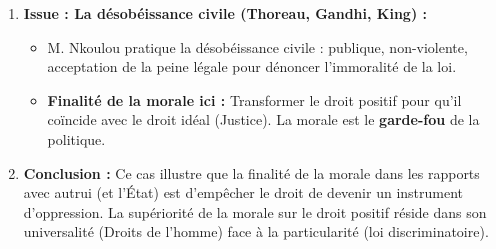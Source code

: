 \documentclass[11pt]{article}
\newcommand{\cle}[1]{{\popxbold\color{popdark}#1}}
\begin{document}
\begin{exoresolu}
\begin{enumerate}
    \item \textbf{Issue : La désobéissance civile (Thoreau, Gandhi, King) :}
    \begin{itemize}
        \item M. Nkoulou pratique la \cle{désobéissance civile} : publique, non-violente, acceptation de la peine légale pour dénoncer l'immoralité de la loi.
        \item \textbf{Finalité de la morale ici :} Transformer le droit positif pour qu'il coïncide avec le droit idéal (Justice). La morale est le \textbf{garde-fou} de la politique.
    \end{itemize}
    \item \textbf{Conclusion :} Ce cas illustre que la \cle{finalité de la morale} dans les rapports avec autrui (et l'État) est d'empêcher le droit de devenir un instrument d'oppression. La supériorité de la morale sur le droit positif réside dans son universalité (Droits de l'homme) face à la particularité (loi discriminatoire).
\end{enumerate}
\end{exoresolu}
\end{document}
